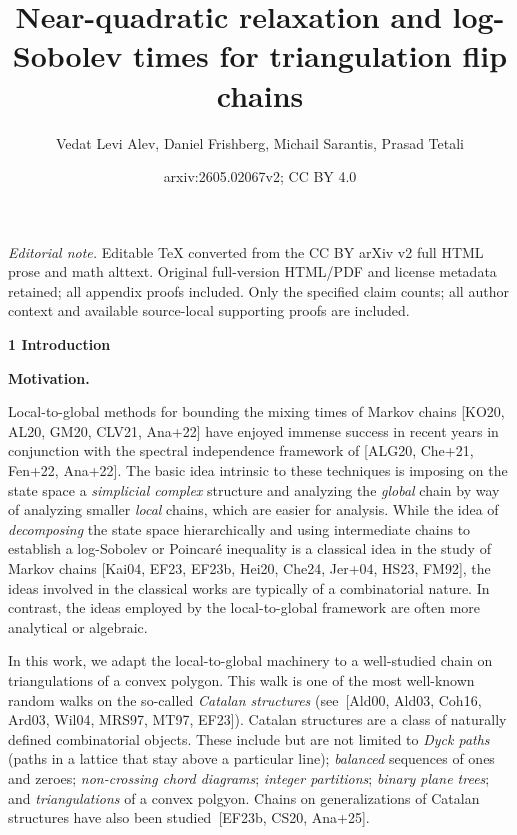 \documentclass[10pt,a4paper]{article}
\title{Near-quadratic relaxation and log-Sobolev times for triangulation flip chains}
\author{Vedat Levi Alev, Daniel Frishberg, Michail Sarantis, Prasad Tetali}
\date{arxiv:2605.02067v2; CC BY 4.0}
\begin{document}
\maketitle
\noindent\textit{Editorial note.} Editable TeX converted from the CC BY arXiv v2 full HTML prose and math alttext. Original full-version HTML/PDF and license metadata retained; all appendix proofs included. Only the specified claim counts; all author context and available source-local supporting proofs are included.\par\medskip


\par\medskip\noindent\textbf{1 Introduction}\par




\par\medskip\noindent\textbf{Motivation.}\par




Local-to-global methods for bounding the mixing times of Markov chains [KO20, AL20, GM20, CLV21, Ana+22] have enjoyed immense success in recent years in conjunction with the spectral independence framework of [ALG20, Che+21, Fen+22, Ana+22]. The basic idea intrinsic to these techniques is imposing on the state space a \emph{simplicial complex} structure and analyzing the \emph{global} chain by way of analyzing smaller \emph{local} chains, which are easier for analysis. While the idea of \emph{decomposing} the state space hierarchically and using intermediate chains to establish a log-Sobolev or Poincaré inequality is a classical idea in the study of Markov chains [Kai04, EF23, EF23b, Hei20, Che24, Jer+04, HS23, FM92], the ideas involved in the classical works are typically of a combinatorial nature. In contrast, the ideas employed by the local-to-global framework are often more analytical or algebraic.\par




In this work, we adapt the local-to-global machinery to a well-studied chain on triangulations of a convex polygon. This walk is one of the most well-known random walks on the so-called \emph{Catalan structures} (see [Ald00, Ald03, Coh16, Ard03, Wil04, MRS97, MT97, EF23]). Catalan structures are a class of naturally defined combinatorial objects. These include but are not limited to \emph{Dyck paths} (paths in a lattice that stay above a particular line); \emph{balanced} sequences of ones and zeroes; \emph{non-crossing chord diagrams}; \emph{integer partitions}; \emph{binary plane trees}; and \emph{triangulations} of a convex polgyon. Chains on generalizations of Catalan structures have also been studied [EF23b, CS20, Ana+25].\par
\end{document}
